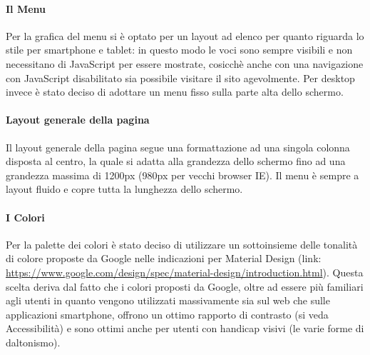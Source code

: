 \paragraph*{Il Menu}
Per la grafica del menu si è optato per un layout ad elenco per quanto riguarda lo stile per smartphone e tablet: in questo modo le voci sono sempre visibili e non necessitano di JavaScript per essere mostrate, cosicch\`e anche con una navigazione con JavaScript disabilitato sia possibile visitare il sito agevolmente.
Per desktop invece è stato deciso di adottare un menu fisso sulla parte alta dello schermo.

\paragraph*{Layout generale della pagina}
Il layout generale della pagina segue una formattazione ad una singola colonna disposta al centro, la quale si adatta alla grandezza dello schermo fino ad una grandezza massima di 1200px (980px per vecchi browser IE).
Il menu è sempre a layout fluido e copre tutta la lunghezza dello schermo.

\paragraph*{I Colori}
Per la palette dei colori è stato deciso di utilizzare un sottoinsieme delle tonalità di colore proposte da Google nelle indicazioni per Material Design (link:  \url{https://www.google.com/design/spec/material-design/introduction.html}). Questa scelta deriva dal fatto che i colori proposti da Google, oltre ad essere più familiari agli utenti in quanto vengono utilizzati massivamente sia sul web che sulle applicazioni smartphone, offrono un ottimo rapporto di contrasto (si veda Accessibilità) e sono ottimi anche per utenti con handicap visivi (le varie forme di daltonismo).
